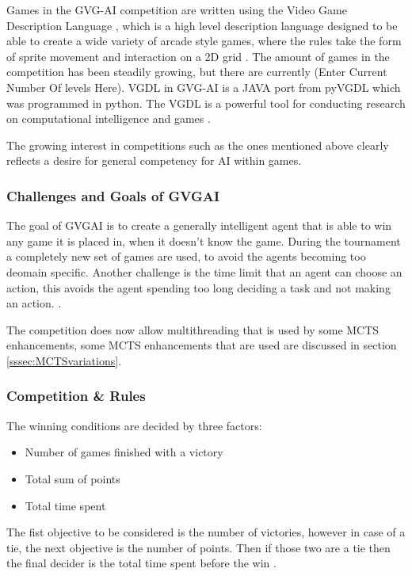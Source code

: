 \documentclass[journal]{IEEEtran}
\begin{document}
		Games in the GVG-AI competition are written using the Video Game Description Language \cite{schaul2014extensible}, which is a high level description language designed to be able to create a wide variety of arcade style games, where the rules take the form of sprite movement and interaction on a 2D grid \cite{nelson2016investigating}.
		The amount of games in the competition has been steadily growing, but there are currently (Enter Current Number Of levels Here). VGDL in GVG-AI is a JAVA port from pyVGDL which was programmed in python. The VGDL is a powerful tool for conducting research on computational intelligence and games \cite{schaul2014extensible, love2008general}.
		
		The growing interest in competitions such as the ones mentioned above clearly reflects a desire for general competency for AI within games.

	\subsubsection{Challenges and Goals of GVGAI}
		The goal of GVGAI is to create a generally intelligent agent that is able to win any game it is placed in, when it doesn't know the game.
		During the tournament a completely new set of games are used, to avoid the agents becoming too deomain specific.
		Another challenge is the time limit that an agent can choose an action, this avoids the agent spending too long deciding a task and not making an action. \cite{schuster2015mcts}.

		The competition does now allow multithreading that is used by some MCTS enhancements, some MCTS enhancements that are used are discussed in section \ref{sssec:MCTSvariations}.
		
		
	\subsubsection{Competition \& Rules}
	
		The winning conditions are decided by three factors:
		\begin{itemize}
		    \item Number of games finished with a victory
		    \item Total sum of points
		    \item Total time spent
		\end{itemize}
		The fist objective to be considered is the number of victories, however in case of a tie, the next objective is the number of points. Then if those two are a tie then the final decider is the total time spent before the win \cite{perez20162014}.
		
\end{document}
